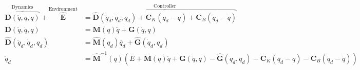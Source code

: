 \documentclass[landscape]{article}
\begin{document}
\fontsize{16}{23}

\begin{align*}
\overbrace{\textbf{D}(\ddot{q},\dot{q},q)}^{\text{Dynamics}}+\overbrace{\textbf{E}}^{\text{Environment}}&=\overbrace{\hat{\textbf{D}}(\ddot{q}_d,\dot{q}_d,q_d) + \textbf{C}_K(q_d-q) + \textbf{C}_B(\dot{q}_d-\dot{q})}^{\text{Controller}}\\
\textbf{D}(\ddot{q},\dot{q},q)&=\textbf{M}(q)\ddot{q}+\textbf{G}(\dot{q},q)\\
\hat{\textbf{D}}(\ddot{q}_d,\dot{q}_d,q_d)&=\hat{\textbf{M}}(q_d)\ddot{q_d}+\hat{\textbf{G}}(\dot{q}_d,q_d)\\
\ddot{q}_d&=\hat{\textbf{M}}^{-1}(q)\left(E+\textbf{M}(q)\ddot{q}+\textbf{G}(\dot{q},q)-\hat{\textbf{G}}(\dot{q}_d,q_d)-\textbf{C}_K(q_d-q)-\textbf{C}_B(\dot{q}_d-\dot{q})\right)
\end{align*}
\end{document}
